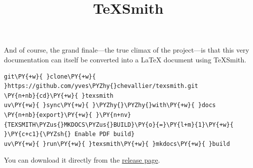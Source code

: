 \documentclass[a4paper,twoside]{article}
\title{TeXSmith}
\author{}\date{}
\begin{document}
\maketitle
And of course, the grand finale---the true climax of the project---is that this very documentation can itself be converted into a \LaTeX{} document using TeXSmith.
\begin{tscode}[lang=bash, engine=pygments]
\begin{Verbatim}[commandchars=\\\{\},breaklines, breakanywhere, commandchars=\\\{\}]
git\PY{+w}{ }clone\PY{+w}{ }https://github.com/yves\PYZhy{}chevallier/texsmith.git
\PY{n+nb}{cd}\PY{+w}{ }texsmith
uv\PY{+w}{ }sync\PY{+w}{ }\PYZhy{}\PYZhy{}with\PY{+w}{ }docs
\PY{n+nb}{export}\PY{+w}{ }\PY{n+nv}{TEXSMITH\PYZus{}MKDOCS\PYZus{}BUILD}\PY{o}{=}\PY{l+m}{1}\PY{+w}{ }\PY{c+c1}{\PYZsh{} Enable PDF build}
uv\PY{+w}{ }run\PY{+w}{ }texsmith\PY{+w}{ }mkdocs\PY{+w}{ }build
\end{Verbatim}
\end{tscode}
You can download it directly from the \href{https://github.com/yves-chevallier/texsmith/releases}{release page}.
\end{document}
